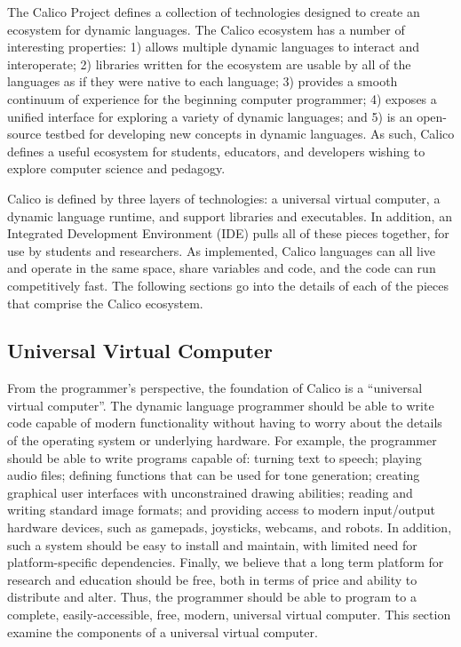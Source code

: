 \documentclass[preprint]{sigplanconf}
\begin{document}
The Calico Project defines a collection of technologies designed to
create an ecosystem for dynamic languages. The Calico ecosystem has a
number of interesting properties: 1) allows multiple dynamic languages
to interact and interoperate; 2) libraries written for the ecosystem
are usable by all of the languages as if they were native to each
language; 3) provides a smooth continuum of experience for the
beginning computer programmer; 4) exposes a unified interface for
exploring a variety of dynamic languages; and 5) is an open-source
testbed for developing new concepts in dynamic languages. As such,
Calico defines a useful ecosystem for students, educators, and
developers wishing to explore computer science and pedagogy.

Calico is defined by three layers of technologies: a universal virtual
computer, a dynamic language runtime, and support libraries and
executables. In addition, an Integrated Development Environment (IDE)
pulls all of these pieces together, for use by students and researchers. As
implemented, Calico languages can all live and operate in the same
space, share variables and code, and the code can run competitively
fast. The following sections go into the details of each of the pieces
that comprise the Calico ecosystem.

\subsection{Universal Virtual Computer}

From the programmer's perspective, the foundation of Calico is a
``universal virtual computer''. The dynamic language programmer should
be able to write code capable of modern functionality without having
to worry about the details of the operating system or underlying
hardware. For example, the programmer should be able to write programs
capable of: turning text to speech; playing audio files; defining
functions that can be used for tone generation; creating graphical
user interfaces with unconstrained drawing abilities; reading and
writing standard image formats; and providing access to modern
input/output hardware devices, such as gamepads, joysticks, webcams,
and robots. In addition, such a system should be easy to install and
maintain, with limited need for platform-specific
dependencies. Finally, we believe that a long term platform for
research and education should be free, both in terms of price and
ability to distribute and alter. Thus, the programmer should be able
to program to a complete, easily-accessible, free, modern, universal
virtual computer. This section examine the components of a universal
virtual computer.
\end{document}
